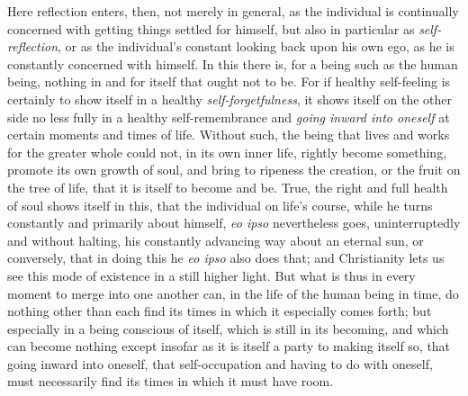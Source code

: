 \documentclass[12pt,a4paper,openany]{book}
\newcommand{\opage}[1]{\marginnote{\footnotesize\textit{[#1]}}}
\begin{document}
Here reflection enters, then, not merely in general, as the individual is
continually concerned with getting things settled for himself, but also in
particular as
\setcounter{footnote}{0}%
\opage{116}\emph{self-reflection}, or as the individual's constant looking back upon his own
ego, as he is constantly concerned with himself. In this there is, for a being such
as the human being, nothing in and for itself that ought not to be. For if healthy
self-feeling is certainly to show itself in a healthy \emph{self-forgetfulness}, it
shows itself on the other side no less fully in a healthy self-remembrance and
\emph{going inward into oneself} at certain moments and times of life. Without such,
the being that lives and works for the greater whole could not, in its own inner
life, rightly become something, promote its own growth of soul, and bring to
ripeness the creation, or the fruit on the tree of life, that it is itself to become
and be. True, the right and full health of soul shows itself in this, that the
individual on life's course, while he turns constantly and primarily about himself,
\textit{eo ipso} nevertheless goes, uninterruptedly and without halting, his
constantly advancing way about an eternal sun, or conversely, that in doing this he
\textit{eo ipso} also does that; and Christianity lets us see this mode of existence
in a still higher light. But what is thus in every moment to merge into one another
can, in the life of the human being in time, do nothing other than each find its
times in which it especially comes forth; but especially in a being conscious of
itself, which is still in its becoming, and which can become nothing except insofar
as it is itself a party to making itself so, that going inward into oneself, that
self-occupation and having to do with oneself, must necessarily find its times in
which it must have room.
\end{document}

